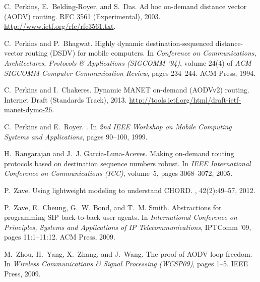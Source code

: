 \documentclass[letterpaper]{sig-alternate-pages}
\begin{document}
\begin{thebibliography}{10}
C.~Perkins, E.~Belding-Royer, and S.~Das.
\newblock Ad hoc on-demand distance vector {(AODV)} routing.
\newblock RFC 3561 (Experimental), 2003.
\newblock \url{http://www.ietf.org/rfc/rfc3561.txt}.

C.~Perkins and P.~Bhagwat.
\newblock Highly dynamic destination-sequenced distance-vector routing {(DSDV)}
  for mobile computers.
\newblock In {\em Conference on Communications, Architectures, Protocols \&
  Applications (SIGCOMM '94)}, volume 24(4) of {\em ACM SIGCOMM Computer
  Communication Review}, pages 234--244. ACM Press, 1994.

C.~Perkins and I.~Chakeres.
\newblock Dynamic {MANET} on-demand {(AODVv2)} routing.
\newblock Internet Draft (Standards Track), 2013.
\newblock \url{http://tools.ietf.org/html/draft-ietf-manet-dymo-26}.

C.~Perkins and E.~Royer.
.
\newblock In {\em 2nd {IEEE} Workshop on Mobile Computing Systems and
  Applications}, pages 90--100, 1999.

H.~Rangarajan and J.~J. Garcia-Luna-Aceves.
\newblock Making on-demand routing protocols based on destination sequence
  numbers robust.
\newblock In {\em IEEE International Conference on Communications (ICC)},
  volume~5, pages 3068--3072, 2005.

P.~Zave.
\newblock Using lightweight modeling to understand {CHORD}.
, 42(2):49--57, 2012.

P.~Zave, E.~Cheung, G.~W. Bond, and T.~M. Smith.
\newblock Abstractions for programming {SIP} back-to-back user agents.
\newblock In {\em International Conference on Principles, Systems and
  Applications of IP Telecommunications}, IPTComm '09, pages 11:1--11:12. ACM
  Press, 2009.

M.~Zhou, H.~Yang, X.~Zhang, and J.~Wang.
\newblock The proof of {AODV} loop freedom.
\newblock In {\em Wireless Communications \& Signal Processing (WCSP09)}, pages
  1--5. IEEE Press, 2009.

\end{thebibliography}

\label{lastpage}
\end{document}
